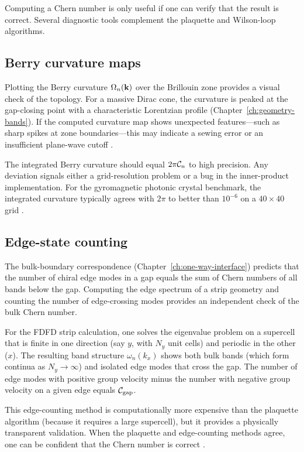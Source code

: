 Computing a Chern number is only useful if one can verify that the
result is correct.  Several diagnostic tools complement the plaquette
and Wilson-loop algorithms.

\subsection{Berry curvature maps}
\label{sec:ch10-berry-maps}

Plotting the Berry curvature $\Omega_n(\mathbf{k})$ over the Brillouin zone
provides a visual check of the topology.  For a massive Dirac cone, the
curvature is peaked at the gap-closing point with a characteristic
Lorentzian profile (Chapter~\ref{ch:geometry-bands}).  If the computed
curvature map shows unexpected features---such as sharp spikes at
zone boundaries---this may indicate a sewing error or an insufficient
plane-wave cutoff \cite{lee2022calculation}.

The integrated Berry curvature should equal $2\pi\mathcal{C}_n$ to high
precision.  Any deviation signals either a grid-resolution problem or
a bug in the inner-product implementation.  For the gyromagnetic
photonic crystal benchmark, the integrated curvature typically agrees
with $2\pi$ to better than $10^{-6}$ on a $40\times 40$ grid
\cite{zhao2020first}.

\subsection{Edge-state counting}
\label{sec:ch10-edge-counting}

The bulk-boundary correspondence (Chapter~\ref{ch:one-way-interface})
predicts that the number of chiral edge modes in a gap equals the
sum of Chern numbers of all bands below the gap.  Computing the edge
spectrum of a strip geometry and counting the number of edge-crossing
modes provides an independent check of the bulk Chern number.

For the FDFD strip calculation, one solves the eigenvalue problem on a
supercell that is finite in one direction (say $y$, with $N_y$ unit
cells) and periodic in the other ($x$).  The resulting band structure
$\omega_n(k_x)$ shows both bulk bands (which form continua as
$N_y\to\infty$) and isolated edge modes that cross the gap.  The
number of edge modes with positive group velocity minus the number
with negative group velocity on a given edge equals $\mathcal{C}_{\mathrm{gap}}$.

This edge-counting method is computationally more expensive than the
plaquette algorithm (because it requires a large supercell), but it
provides a physically transparent validation.  When the plaquette
and edge-counting methods agree, one can be confident that the
Chern number is correct \cite{ozawa2018topological,hafezi2013imaging}.

